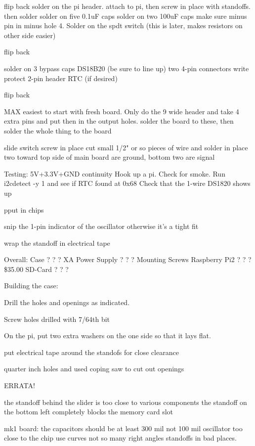 \documentclass[11pt]{article}
\begin{document}
	flip back
	solder on the pi header.  attach to pi, then screw in place
		with standoffs. then solder
	solder on five 0.1uF caps
	solder on two 100uF caps make sure minus pin in minus hole
	4. Solder on the spdt switch (this is later, makes resistors
	on other side easier)


	flip back

	solder on 3 bypass caps
	DS18B20 (be sure to line up)
	two 4-pin connectors
	write protect 2-pin header
	RTC (if desired)

	flip back

	MAX
		easiest to start with fresh board.
		Only do the 9 wide header and take 4 extra pins
		and put then in the output holes.
		solder the board to these, then solder the whole thing
		to the board
	
	slide switch
		screw in place
		cut small 1/2" or so pieces of wire and solder in place
		two toward top side of main board are ground, 
		bottom two are signal

	Testing:
		5V+3.3V+GND continuity
		Hook up a pi.  Check for smoke.
		Run i2cdetect -y 1 and see if RTC found at 0x68
		Check that the 1-wire DS1820 shows up
			

	pput in chips

	snip the 1-pin indicator of the oscillator otherwise it's
	a tight fit

	wrap the standoff in electrical tape
		

Overall:
	Case		?		?		?
	XA Power Supply	?		?		?
	Mounting Screws
	Raspberry Pi2	?		?		?	\$35.00
	SD-Card		?		?		?


Building the case:

	Drill the holes and openings as indicated.

	Screw holes drilled with 7/64th bit

	On the pi, put two extra washers on the one side so that it lays
	flat.

	put electrical tape around the standofs for close clearance
	
	quarter inch holes and used coping saw to cut out openings





ERRATA!

the standoff behind the slider is too close to various components
the standoff on the bottom left completely blocks the memory card slot

mk1 board:
the capacitors should be at least 300 mil not 100 mil
oscillator too close to the chip
use curves not so many right angles
standoffs in bad places.
\end{document}
